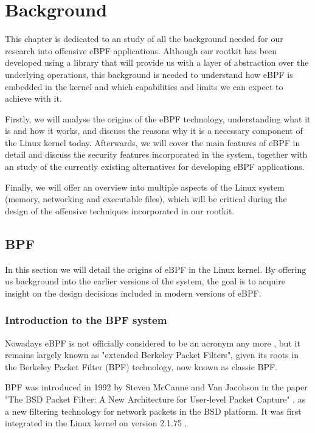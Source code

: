 \chapter{Background}
This chapter is dedicated to an study of all the background needed for our research into offensive eBPF applications. Although our rootkit has been developed using a library that will provide us with a layer of abstraction over the underlying operations, this background is needed to understand how eBPF is embedded in the kernel and which capabilities and limits we can expect to achieve with it.

Firstly, we will analyse the origins of the eBPF technology, understanding what it is and how it works, and discuss the reasons why it is a necessary component of the Linux kernel today. Afterwards, we will cover the main features of eBPF in detail and discuss the security features incorporated in the system, together with an study of the currently existing alternatives for developing eBPF applications.

Finally, we will offer an overview into multiple aspects of the Linux system (memory, networking and executable files), which will be critical during the design of the offensive techniques incorporated in our rootkit.

\section{BPF}
In this section we will detail the origins of eBPF in the Linux kernel. By offering us background into the earlier versions of the system, the goal is to acquire insight on the design decisions included in modern versions of eBPF.

\subsection{Introduction to the BPF system}
Nowadays eBPF is not officially considered to be an acronym any more \cite{ebpf_io}, but it remains largely known as "extended Berkeley Packet Filters", given its roots in the Berkeley Packet Filter (BPF) technology, now known as classic BPF.

BPF was introduced in 1992 by Steven McCanne and Van Jacobson in the paper "The BSD Packet Filter: A New Architecture for User-level Packet Capture" \cite{bpf_bsd_origin}, as a new filtering technology for network packets in the BSD platform. It was first integrated in the Linux kernel on version 2.1.75 \cite{ebpf_history_opensource}.


